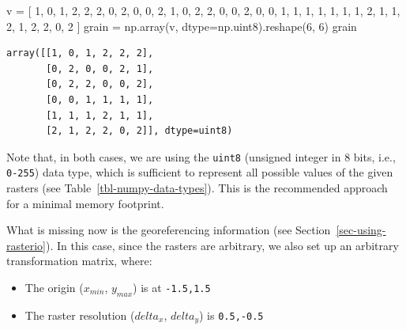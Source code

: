 \documentclass[
  letterpaper,
]{krantz}
\newenvironment{Shaded}{\begin{snugshade}}{\end{snugshade}}
\newcommand{\DecValTok}[1]{\textcolor[rgb]{0.68,0.00,0.00}{#1}}
\newcommand{\NormalTok}[1]{\textcolor[rgb]{0.00,0.23,0.31}{#1}}
\newcommand{\OperatorTok}[1]{\textcolor[rgb]{0.37,0.37,0.37}{#1}}
\providecommand{\tightlist}{%
  \setlength{\itemsep}{0pt}\setlength{\parskip}{0pt}}\usepackage{longtable,booktabs,array}
\begin{document}
\begin{Shaded}
\begin{Highlighting}[]
\NormalTok{v }\OperatorTok{=}\NormalTok{ [}
  \DecValTok{1}\NormalTok{, }\DecValTok{0}\NormalTok{, }\DecValTok{1}\NormalTok{, }\DecValTok{2}\NormalTok{, }\DecValTok{2}\NormalTok{, }\DecValTok{2}\NormalTok{, }
  \DecValTok{0}\NormalTok{, }\DecValTok{2}\NormalTok{, }\DecValTok{0}\NormalTok{, }\DecValTok{0}\NormalTok{, }\DecValTok{2}\NormalTok{, }\DecValTok{1}\NormalTok{, }
  \DecValTok{0}\NormalTok{, }\DecValTok{2}\NormalTok{, }\DecValTok{2}\NormalTok{, }\DecValTok{0}\NormalTok{, }\DecValTok{0}\NormalTok{, }\DecValTok{2}\NormalTok{, }
  \DecValTok{0}\NormalTok{, }\DecValTok{0}\NormalTok{, }\DecValTok{1}\NormalTok{, }\DecValTok{1}\NormalTok{, }\DecValTok{1}\NormalTok{, }\DecValTok{1}\NormalTok{, }
  \DecValTok{1}\NormalTok{, }\DecValTok{1}\NormalTok{, }\DecValTok{1}\NormalTok{, }\DecValTok{2}\NormalTok{, }\DecValTok{1}\NormalTok{, }\DecValTok{1}\NormalTok{, }
  \DecValTok{2}\NormalTok{, }\DecValTok{1}\NormalTok{, }\DecValTok{2}\NormalTok{, }\DecValTok{2}\NormalTok{, }\DecValTok{0}\NormalTok{, }\DecValTok{2}
\NormalTok{]}
\NormalTok{grain }\OperatorTok{=}\NormalTok{ np.array(v, dtype}\OperatorTok{=}\NormalTok{np.uint8).reshape(}\DecValTok{6}\NormalTok{, }\DecValTok{6}\NormalTok{)}
\NormalTok{grain}
\end{Highlighting}
\end{Shaded}

\begin{verbatim}
array([[1, 0, 1, 2, 2, 2],
       [0, 2, 0, 0, 2, 1],
       [0, 2, 2, 0, 0, 2],
       [0, 0, 1, 1, 1, 1],
       [1, 1, 1, 2, 1, 1],
       [2, 1, 2, 2, 0, 2]], dtype=uint8)
\end{verbatim}

Note that, in both cases, we are using the \texttt{uint8} (unsigned
integer in 8 bits, i.e., \texttt{0-255}) data type, which is sufficient
to represent all possible values of the given rasters (see
Table~\ref{tbl-numpy-data-types}). This is the recommended approach for
a minimal memory footprint.

What is missing now is the georeferencing information (see
Section~\ref{sec-using-rasterio}). In this case, since the rasters are
arbitrary, we also set up an arbitrary transformation matrix, where:

\begin{itemize}
\tightlist
\item
  The origin (\(x_{min}\), \(y_{max}\)) is at \texttt{-1.5,1.5}
\item
  The raster resolution (\(delta_{x}\), \(delta_{y}\)) is
  \texttt{0.5,-0.5}
\end{itemize}
\end{document}
